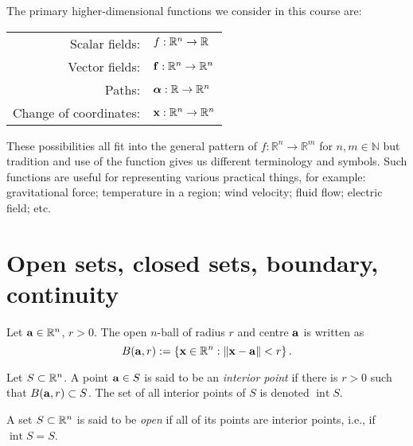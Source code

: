 \begin{samepage}
    The primary higher-dimensional functions we consider in this course are:
    \begin{center}
        \begin{tabular}{r l}
            Scalar fields:
             &
            \(f:\bR^n \to \bR\)                   \\
            Vector fields:
             &
            \(\mathbf{f}:\bR^n \to \bR^n\)        \\
            Paths:
             &
            \(\boldsymbol{\alpha}:\bR \to \bR^n\) \\
            Change of coordinates:
             &
            \(\xx:\bR^n \to \bR^n\)
        \end{tabular}
    \end{center}
\end{samepage}
\noindent
These possibilities all fit into the general pattern of \(f:\mathbb{R}^n \to \mathbb{R}^m\) for \(n,m\in \mathbb{N}\) but tradition and use of the function gives us different terminology and symbols.
Such functions are useful for representing various practical things, for example:
gravitational force; temperature in a region; wind velocity; fluid flow; electric field; etc.



\section{Open sets, closed sets, boundary, continuity}

Let \(\aa \in \bR^n\), \(r>0\).
The open \(n\)-ball of radius \(r\) and centre \(\aa\) is written as
\[
    B(\aa,r):= \left\{ \xx \in \bR^n : \norm{\xx - \aa}< r  \right\}.
\]

\begin{definition}
    Let \(S \subset \bR^n\).
    A point \(\aa \in S\) is said to be an \emph{interior point} if there is \(r>0\) such that \( B(\aa,r) \subset S\).
    The set of all interior points of \(S\) is denoted \(\operatorname{int} S\).
\end{definition}

\begin{definition}
    A set \(S \subset \bR^n\) is said to be \emph{open} if all of its points are interior points, i.e., if \(\operatorname{int} S = S\).
\end{definition}



